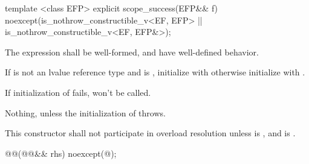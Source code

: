 \documentclass[ebook,11pt,article]{memoir}
\begin{document}
\begin{itemdecl}
template <class EFP>
explicit
scope_success(EFP&& f) noexcept(is_nothrow_constructible_v<EF, EFP>
                             || is_nothrow_constructible_v<EF, EFP&>);
\end{itemdecl}

\begin{itemdescr}
\pnum
\requires 
The expression  shall be well-formed, and have well-defined behavior.


\pnum
\effects If  is not an lvalue reference type and  is , initialize   with  otherwise initialize  with . 
\begin{note}
If initialization of  fails,  won't be called.
\end{note}

\pnum
\throws Nothing, unless the initialization of  throws.

\pnum
\remarks This constructor shall not participate in overload resolution unless 
 is , and
 is .
\end{itemdescr}

\newpage
\begin{itemdecl}
@@(@@&& rhs) noexcept(@\seebelow@);
\end{itemdecl}
\end{document}
